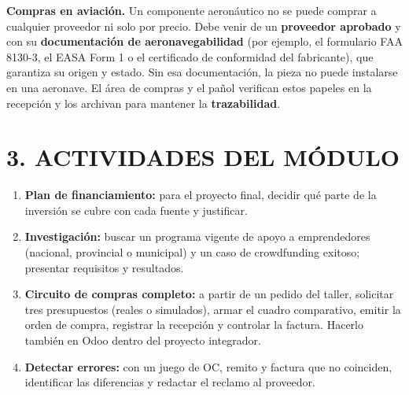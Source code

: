\begin{recuadro}
\textbf{Compras en aviación.} Un componente aeronáutico no se puede comprar a cualquier
proveedor ni solo por precio. Debe venir de un \textbf{proveedor aprobado} y con su
\textbf{documentación de aeronavegabilidad} (por ejemplo, el formulario FAA 8130-3, el EASA
Form 1 o el certificado de conformidad del fabricante), que garantiza su origen y estado. Sin
esa documentación, la pieza no puede instalarse en una aeronave. El área de compras y el pañol
verifican estos papeles en la recepción y los archivan para mantener la
\textbf{trazabilidad}.
\end{recuadro}

\section*{3. ACTIVIDADES DEL MÓDULO}

\begin{enumerate}
  \item \textbf{Plan de financiamiento:} para el proyecto final, decidir qué parte de la
        inversión se cubre con cada fuente y justificar.
  \item \textbf{Investigación:} buscar un programa vigente de apoyo a emprendedores (nacional,
        provincial o municipal) y un caso de crowdfunding exitoso; presentar requisitos y
        resultados.
  \item \textbf{Circuito de compras completo:} a partir de un pedido del taller, solicitar tres
        presupuestos (reales o simulados), armar el cuadro comparativo, emitir la orden de
        compra, registrar la recepción y controlar la factura. Hacerlo también en Odoo dentro
        del proyecto integrador.
  \item \textbf{Detectar errores:} con un juego de OC, remito y factura que no coinciden,
        identificar las diferencias y redactar el reclamo al proveedor.
\end{enumerate}
